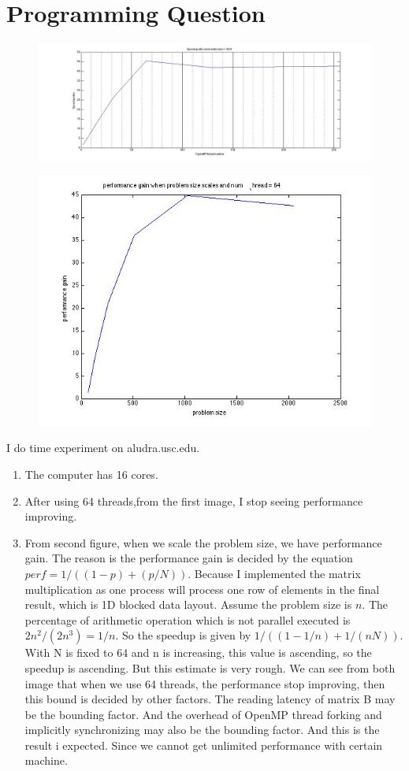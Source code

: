 \documentclass[11pt]{article}
\begin{document}
\section{Programming Question}
\begin{figure}[H]
\includegraphics[scale=0.4]{speedup}
\centering
\end{figure}
\begin{figure}[H]
\includegraphics[scale=0.8]{perf}
\centering
\end{figure}
I do time experiment on aludra.usc.edu. 
\begin{enumerate}
\item The computer has 16 cores.
\item After using 64 threads,from the first image, I stop seeing performance improving.
\item From second figure, when we scale the problem size, we have performance gain. The reason is the performance gain is decided by the equation $perf=1/((1-p)+(p/N))$. Because I implemented the matrix multiplication as one process will process one row of elements in the final result, which is 1D blocked data layout. Assume the problem size is $n$. The percentage of arithmetic operation which is not parallel executed is $2n^2/(2n^3)=1/n$. So the speedup is given by $1/((1-1/n)+1/(nN))$. With N is fixed to 64 and n is increasing, this value is ascending, so the speedup is ascending. But this estimate is very rough. We can see from both image that when we use 64 threads, the performance stop improving, then this bound is decided by other factors. The reading latency of matrix B may be the bounding factor. And the overhead of OpenMP thread forking and implicitly synchronizing may also be the bounding factor. And this is the result i expected. Since we cannot get unlimited performance with certain machine.  
\end{enumerate}
\end{document}
